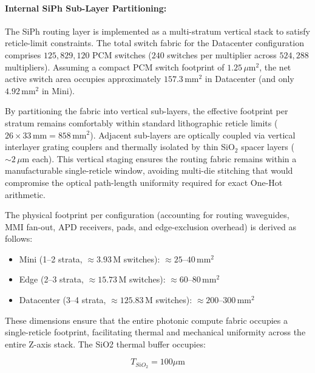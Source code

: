 \documentclass[journal]{IEEEtran}
\begin{document}
\paragraph{\textbf{Internal SiPh Sub-Layer Partitioning:}}

The SiPh routing layer is implemented as a multi-stratum vertical stack to satisfy reticle-limit constraints. The total switch fabric for the Datacenter configuration comprises $125,829,120$ PCM switches ($240$ switches per multiplier across $524,288$ multipliers). Assuming a compact PCM switch footprint of $1.25\,\mu\text{m}^{2}$, the net active switch area occupies approximately $157.3\,\text{mm}^2$ in Datacenter (and only $4.92\,\text{mm}^2$ in Mini).

By partitioning the fabric into vertical sub-layers, the effective footprint per stratum remains comfortably within standard lithographic reticle limits ($26 \times 33\,\text{mm} = 858\,\text{mm}^2$). Adjacent sub-layers are optically coupled via vertical interlayer grating couplers and thermally isolated by thin SiO$_2$ spacer layers ($\sim 2\,\mu\text{m}$ each). This vertical staging ensures the routing fabric remains within a manufacturable single-reticle window, avoiding multi-die stitching that would compromise the optical path-length uniformity required for exact One-Hot arithmetic.

The physical footprint per configuration (accounting for routing waveguides, MMI fan-out, APD receivers, pads, and edge-exclusion overhead) is derived as follows:

\begin{itemize}
\item Mini (1--2 strata, $\approx 3.93\,\text{M}$ switches): $\approx 25\text{--}40\,\text{mm}^{2}$
\item Edge (2--3 strata, $\approx 15.73\,\text{M}$ switches): $\approx 60\text{--}80\,\text{mm}^{2}$
\item Datacenter (3--4 strata, $\approx 125.83\,\text{M}$ switches): $\approx 200\text{--}300\,\text{mm}^{2}$
\end{itemize}

These dimensions ensure that the entire photonic compute fabric occupies a single-reticle footprint, facilitating thermal and mechanical uniformity across the entire Z-axis stack. The SiO2 thermal buffer occupies:

\begin{equation}
T_{SiO_2} = 100 \mu\text{m}
\end{equation}
\end{document}
